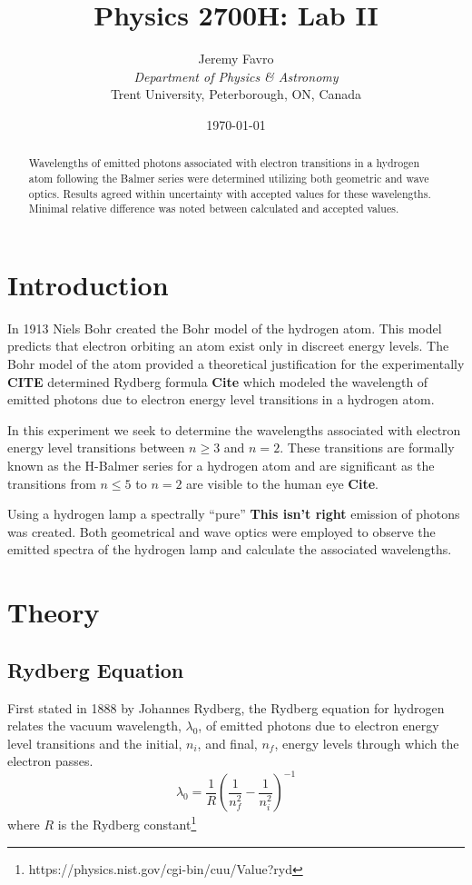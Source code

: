 \documentclass[10pt, twocolumn]{article}
\title{Physics 2700H: Lab II}
\author{Jeremy Favro \\\emph{Department of Physics \& Astronomy}\\ Trent University, Peterborough, ON, Canada}
\date{\today}
\theoremstyle{definition}
\begin{document}
\maketitle
\begin{abstract}
  Wavelengths of emitted photons associated with electron transitions in a hydrogen atom following the Balmer series were determined utilizing both geometric and wave optics.
  Results agreed within uncertainty with accepted values for these wavelengths. Minimal relative difference was noted between calculated and accepted values.
\end{abstract}
\section{Introduction}
In 1913 Niels Bohr created the Bohr model of the hydrogen atom. This model predicts that electron orbiting an atom exist only in discreet
energy levels. The Bohr model of the atom provided a theoretical justification for the experimentally \textbf{CITE} determined Rydberg formula \textbf{Cite}
which modeled the wavelength of emitted photons due to electron energy level transitions in a hydrogen atom.

In this experiment we seek to determine the wavelengths associated with electron energy level transitions between $n\geq 3$ and $n=2$.
These transitions are formally known as the H-Balmer series for a hydrogen atom and are significant as the transitions from $n\leq 5$ to $n=2$ are
visible to the human eye \textbf{Cite}.

Using a hydrogen lamp a spectrally ``pure'' \textbf{This isn't right} emission of photons was created. Both
geometrical and wave optics were employed to observe the emitted spectra of the hydrogen lamp and calculate the associated wavelengths.
\section{Theory}
\subsection{Rydberg Equation}
First stated in 1888 by Johannes Rydberg, the Rydberg equation for hydrogen relates the vacuum wavelength, $\lambda_0$, of emitted photons due to electron energy level transitions
and the initial, $n_i$, and final, $n_f$, energy levels through which the electron passes.
\begin{equation}
  \lambda_{0}=\frac{1}{R}\left(\frac{1}{n_f^2}-\frac{1}{n_i^2}\right)^{-1}
\end{equation}
where $R$ is the Rydberg constant\footnote{https://physics.nist.gov/cgi-bin/cuu/Value?ryd}
\end{document}
